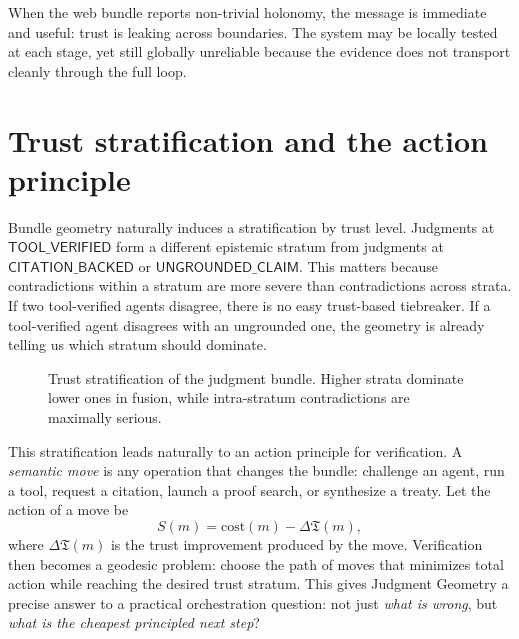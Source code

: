 \documentclass[11pt]{article}
\newcommand{\Trust}{\mathfrak{T}}
\newcommand{\ToolExec}{\mathsf{TOOL\_EXECUTED}}
\newcommand{\ToolVerified}{\mathsf{TOOL\_VERIFIED}}
\newcommand{\Citation}{\mathsf{CITATION\_BACKED}}
\newcommand{\Ungrounded}{\mathsf{UNGROUNDED\_CLAIM}}
\begin{document}
When the web bundle reports non-trivial holonomy, the message is immediate and
useful: trust is leaking across boundaries.  The system may be locally tested at
each stage, yet still globally unreliable because the evidence does not transport
cleanly through the full loop.

\section{Trust stratification and the action principle}\label{sec:stratification}

Bundle geometry naturally induces a stratification by trust level.  Judgments at
$\ToolVerified$ form a different epistemic stratum from judgments at
$\Citation$ or $\Ungrounded$.  This matters because contradictions within a
stratum are more severe than contradictions across strata.  If two tool-verified
agents disagree, there is no easy trust-based tiebreaker.  If a tool-verified
agent disagrees with an ungrounded one, the geometry is already telling us which
stratum should dominate.

\begin{figure}[H]
\centering
{}
\caption{Trust stratification of the judgment bundle.  Higher strata dominate
lower ones in fusion, while intra-stratum contradictions are maximally serious.}
\label{fig:stratification}
\end{figure}

This stratification leads naturally to an action principle for verification.
A \emph{semantic move} is any operation that changes the bundle: challenge an
agent, run a tool, request a citation, launch a proof search, or synthesize a
treaty.  Let the action of a move be
\[
  S(m) = \mathrm{cost}(m) - \Delta \Trust(m),
\]
where $\Delta \Trust(m)$ is the trust improvement produced by the move.
Verification then becomes a geodesic problem: choose the path of moves that
minimizes total action while reaching the desired trust stratum.  This gives
Judgment Geometry a precise answer to a practical orchestration question: not
just \emph{what is wrong}, but \emph{what is the cheapest principled next step}?
\end{document}
